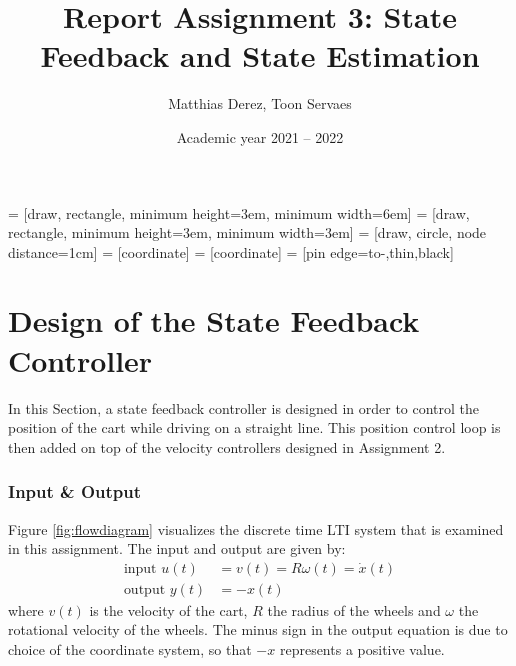 \documentclass[a4paper,kul]{kulakarticle} %
\date{Academic year 2021 -- 2022}
\title{Report Assignment 3: State Feedback and State Estimation}
\author{Matthias Derez, Toon Servaes}
\begin{document}
\maketitle

\tableofcontents
\listoffigures
\listoftables

 = [draw, rectangle, 
minimum height=3em, minimum width=6em]
 = [draw, rectangle, 
minimum height=3em, minimum width=3em]
 = [draw, circle, node distance=1cm]
 = [coordinate]
 = [coordinate]
 = [pin edge={to-,thin,black}]



\newpage
\section{Design of the State Feedback Controller}
In this Section, a state feedback controller is designed in order to control the position of the cart while driving on a straight line. This position control loop is then added on top of the velocity controllers designed in Assignment 2. 

\subsubsection*{Input \& Output}
Figure \ref{fig:flowdiagram} visualizes the discrete time LTI system that is examined in this assignment. The input and output are given by:
\begin{equation}
	\begin{split}
	\text{input } u(t) &= v(t) = R\omega(t) = \dot{x}(t) \\
	\text{output } y(t) &= -x(t)
	\end{split}
\end{equation}
where $v(t)$ is the velocity of the cart, $R$ the radius of the wheels and $\omega$ the rotational velocity of the wheels. The minus sign in the output equation is due to choice of the coordinate system, so that $-x$ represents a positive value. 
\end{document}
